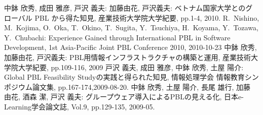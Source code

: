 \documentclass[a4j,9pt,twocolumn,twoside]{jsarticle}
\newcommand{\me}{中鉢 欣秀}
\newcommand{\meen}{Y.~Chubachi}
\begin{document}
\begin{thebibliography}{99}
		 \me, 成田 雅彦, 戸沢 義夫: 加藤由花, 戸沢義夫: ベトナム国家大学とのグローバル PBL から得た知見, 産業技術大学院大学紀要, pp.1-4, 2010. 
		 R.~Nishino, M.~Kojima, O.~Oka, T.~Okino, T.~Sugita, Y.~Tsuchiya, H.~Koyama, Y.~Tozawa, \meen: Experience Gained through International PBL in Software Development, 1st Asia-Pacific Joint PBL Conference 2010, 2010-10-23
		 \me, 加藤由花, 戸沢義夫: PBL用情報インフラストラクチャの構築と運用, 産業技術大学院大学紀要, pp.109-116, 2009
		 戸沢 義夫, 成田 雅彦, \me, 土屋 陽介: Global PBL Feasibility Studyの実践と得られた知見, 情報処理学会 情報教育シンポジウム論文集, pp.167-174,2009-08-20.
		 \me, 土屋 陽介, 長尾 雄行, 加藤 由花, 酒森 潔, 戸沢 義夫: グループウェア導入によるPBLの見える化, 日本e-Learning学会論文誌, Vol.9, pp.129-135, 2009-05.

\end{thebibliography}
\end{document}
